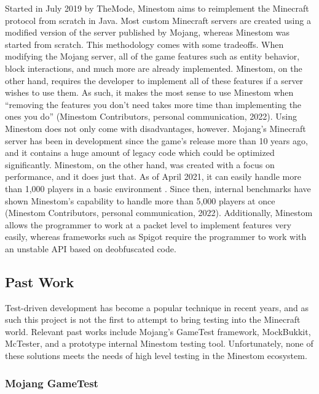 \documentclass[12pt]{article}
\begin{document}
\begin{onehalfspacing}
Started in July 2019 by TheMode, Minestom aims to reimplement the
Minecraft protocol from scratch in Java. Most custom Minecraft servers
are created using a modified version of the server published by Mojang,
whereas Minestom was started from scratch. This methodology comes with
some tradeoffs. When modifying the Mojang server, all of the game
features such as entity behavior, block interactions, and much more are
already implemented. Minestom, on the other hand, requires the developer
to implement all of these features if a server wishes to use them. As
such, it makes the most sense to use Minestom when ``removing the
features you don't need takes more time than implementing the ones you
do'' (Minestom Contributors, personal communication, 2022). Using
Minestom does not only come with disadvantages, however. Mojang's
Minecraft server has been in development since the game's release more
than 10 years ago, and it contains a huge amount of legacy code which
could be optimized significantly. Minestom, on the other hand, was
created with a focus on performance, and it does just that. As of April
2021, it can easily handle more than 1,000 players in a basic
environment \parencite{minestom1500players}.
Since then, internal benchmarks have shown
Minestom's capability to handle more than 5,000 players at once
(Minestom Contributors, personal communication, 2022). Additionally,
Minestom allows the programmer to work at a packet level to implement
features very easily, whereas frameworks such as Spigot require the
programmer to work with an unstable API based on deobfuscated code.

\subsection{Past Work}

Test-driven development has become a popular technique in recent years,
and as such this project is not the first to attempt to bring testing
into the Minecraft world. Relevant past works include Mojang's GameTest
framework, MockBukkit, McTester, and a prototype internal Minestom
testing tool. Unfortunately, none of these solutions meets the needs of
high level testing in the Minestom ecosystem.

\subsubsection{Mojang GameTest}


\end{onehalfspacing}
\end{document}
